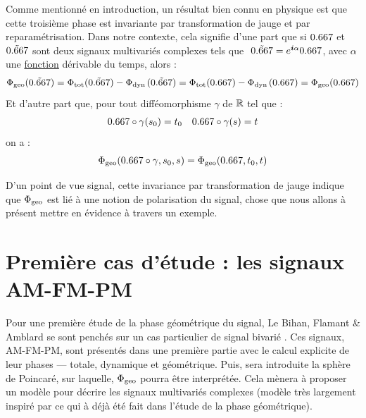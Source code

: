 Comme mentionné en introduction, un résultat bien connu en physique \cite{bohm_geometric_2003,mukunda_quantum_1993,chruscinski_geometric_2004} est que cette troisième phase est invariante par transformation de jauge et par reparamétrisation.
Dans notre contexte, cela signifie d'une part que si $\x$ et $\Tilde{\x}$ sont deux signaux multivariés complexes tels que $\ \Tilde{\x} = e^{\i \alpha}\x$, avec $\alpha$ une \underline{fonction} dérivable du temps, alors :
\begin{align*}
	\phaseg(\Tilde{\x}) &= \phaset(\Tilde{\x}) - \phased(\Tilde{\x})  = \phaset(\x) - \phased(\x) = \phaseg(\x)\\
\end{align*}
Et d'autre part que, pour tout difféomorphisme $\gamma$ de $\mathbb{R}$ tel que :
\begin{align*}
	\x\circ\gamma(s_0)&=t_0  &  \x \circ\gamma(s) = t
\end{align*}
on a :
\[\phaseg(\x \circ \gamma, s_0, s) = \phaseg(\x, t_0, t)\]
\skipl


D'un point de vue signal, cette invariance par transformation de jauge indique que $\Phi_{\text{\normalfont geo}}$ est lié à une notion de polarisation du signal, chose que nous allons à présent mettre en évidence à travers un exemple.
\\



\section{Première cas d'étude : les signaux AM-FM-PM} \label{sec:AM-FM-PM}

Pour une première étude de la phase géométrique du signal, Le Bihan, Flamant \& Amblard se sont penchés sur un cas particulier de signal bivarié \cite{flamant_timefrequency_2019,le_bihan_modephysiques_2023, le_bihan_geometric_2024}. Ces signaux, AM-FM-PM, sont présentés dans une première partie avec le calcul explicite de leur phases --- totale, dynamique et géométrique. Puis, sera introduite la sphère de Poincaré, sur laquelle, $\Phi_{\text{\normalfont geo}}$ pourra être interprétée.
Cela mènera à proposer un modèle pour décrire les signaux multivariés complexes (modèle très largement inspiré par ce qui à déjà été fait dans l'étude de la phase géométrique).
\\




